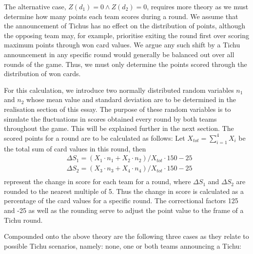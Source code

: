 The alternative case, $Z(d_1) = 0 \land Z(d_2) = 0$, requires more theory as we must determine how many points each team scores during a round. We assume that the announcement of Tichus has no effect on the distribution of points, although the opposing team may, for example, prioritise exiting the round first over scoring maximum points through won card values. We argue any such shift by a Tichu announcement in any specific round would generally be balanced out over all rounds of the game. Thus, we must only determine the points scored through the distribution of won cards.

For this calculation, we introduce two normally distributed random variables $n_1$ and $n_2$ whose mean value and standard deviation are to be determined in the realisation section of this essay. The purpose of these random variables is to simulate the fluctuations in scores obtained every round by both teams throughout the game. This will be explained further in the next section. The scored points for a round are to be calculated as follows: Let $X_{tot} = \sum_{i=1}^{4} X_i$ be the total sum of card values in this round, then
\begin{align*}
    &\Delta S_1 = (X_1\cdot n_1 + X_2\cdot n_2)/ X_{tot} \cdot 150 - 25\\
    &\Delta S_2 = (X_3\cdot n_3 + X_4\cdot n_4)/ X_{tot} \cdot 150 - 25\\
\end{align*}
represent the change in score for each team for a round, where $\Delta S_1$ and $\Delta S_2$ are rounded to the nearest multiple of 5. Thus the change in score is calculated as a percentage of the card values for a specific round. The correctional factors 125 and -25 as well as the rounding serve to adjust the point value to the frame of a Tichu round.

Compounded onto the above theory are the following three cases as they relate to possible Tichu scenarios, namely: none, one or both teams announcing a Tichu:

